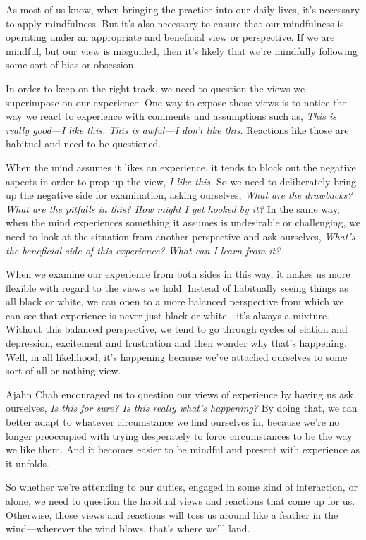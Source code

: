 As most of us know, when bringing the practice into our daily lives, 
it's necessary to apply mindfulness. But it's also necessary to ensure 
that our mindfulness is operating under an appropriate and beneficial 
view or perspective. If we are mindful, but our view is misguided, then 
it's likely that we're mindfully following some sort of bias or 
obsession.

In order to keep on the right track, we need to question the views we 
superimpose on our experience. One way to expose those views is to 
notice the way we react to experience with comments and assumptions 
such as, \emph{This is really good---I like this. This is awful---I 
don't like this.} Reactions like those are habitual and need to be 
questioned.

When the mind assumes it likes an experience, it tends to block out the 
negative aspects in order to prop up the view, \emph{I like this.} So 
we need to deliberately bring up the negative side for examination, 
asking ourselves, \emph{What are the drawbacks? What are the pitfalls 
in this? How might I get hooked by it?} In the same way, when the mind 
experiences something it assumes is undesirable or challenging, we need 
to look at the situation from another perspective and ask ourselves, 
\emph{What's the beneficial side of this experience? What can I learn 
from it?}

When we examine our experience from both sides in this way, it makes us 
more flexible with regard to the views we hold. Instead of habitually 
seeing things as all black or white, we can open to a more balanced 
perspective from which we can see that experience is never just black 
or white---it's always a mixture. Without this balanced perspective, we 
tend to go through cycles of elation and depression, excitement and 
frustration and then wonder why that's happening. Well, in all 
likelihood, it's happening because we've attached ourselves to some 
sort of all-or-nothing view.

Ajahn Chah encouraged us to question our views of experience by having 
us ask ourselves, \emph{Is this for sure? Is this really what's 
happening?} By doing that, we can better adapt to whatever circumstance 
we find ourselves in, because we're no longer preoccupied with trying 
desperately to force circumstances to be the way we like them. And it 
becomes easier to be mindful and present with experience as it unfolds.

So whether we're attending to our duties, engaged in some kind of 
interaction, or alone, we need to question the habitual views and 
reactions that come up for us. Otherwise, those views and reactions 
will toss us around like a feather in the wind---wherever the wind 
blows, that's where we'll land.

